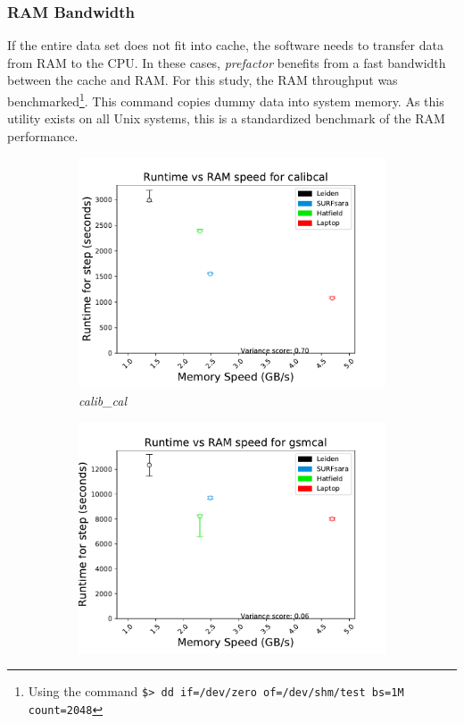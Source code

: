 \subsubsection{RAM Bandwidth}

If the entire data set does not fit into cache, the software needs to transfer data from RAM to the CPU. In these cases,  \textit{prefactor} benefits from a fast bandwidth between the cache and RAM. For this study, the RAM throughput was benchmarked\footnote{Using the command \texttt{\$> dd if=/dev/zero of=/dev/shm/test  bs=1M count=2048}}. This command copies dummy data into system memory. As this utility exists on all Unix systems, this is a standardized benchmark of the RAM performance. 

\begin{figure}
\centering
    \begin{subfigure}[b]{0.45\linewidth}
    \includegraphics[width=\linewidth]{ch4/figures/fig9/calibcal_MEM.pdf}
      \caption{\textit{calib\_cal}}
	\label{fig:ch4_calib_cal_RAM}
 \end{subfigure}%
    \begin{subfigure}[b]{0.45\linewidth}
    \includegraphics[width=\linewidth]{ch4/figures/fig9/gsmcal_MEM.pdf}

\end{subfigure}
\end{figure}
